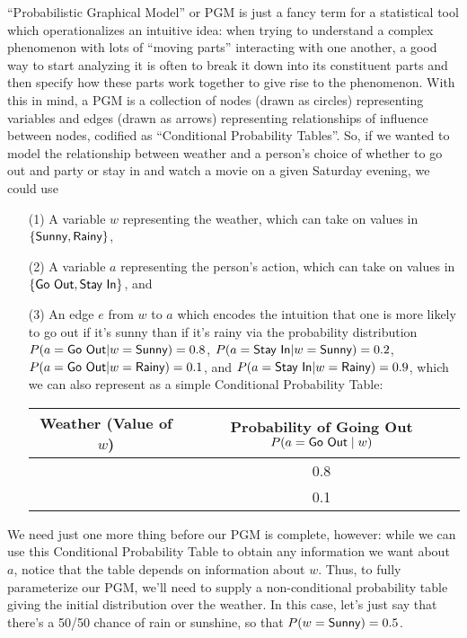 “Probabilistic Graphical Model” or PGM is just a fancy term for a statistical tool which operationalizes an intuitive idea: when trying to understand a complex phenomenon with lots of “moving parts” interacting with one another, a good way to start analyzing it is often to break it down into its constituent parts and then specify how these parts work together to give rise to the phenomenon. With this in mind, a PGM is a collection of nodes (drawn as circles) representing variables and edges (drawn as arrows) representing relationships of influence between nodes, codified as “Conditional Probability Tables”. So, if we wanted to model the relationship between weather and a person’s choice of whether to go out and party or stay in and watch a movie on a given Saturday evening, we could use
\begin{enumerate}
\item[(1)] A variable $w$ representing the weather, which can take on values in $\{\textsf{Sunny}{}, \textsf{Rainy}{}\}$,
\item[(2)] A variable $a$ representing the person’s action, which can take on values in $\{\textsf{Go Out}{}, \textsf{Stay In}{}\}$, and 
\item[(3)] An edge $e$ from $w$ to $a$ which encodes the intuition that one is more likely to go out if it’s sunny than if it’s rainy via the probability distribution $P(a = \textsf{Go Out}{} | w = \textsf{Sunny}{}) = 0.8$, $P(a = \textsf{Stay In}{} | w = \textsf{Sunny}{}) = 0.2$, $P(a = \textsf{Go Out}{} | w = \textsf{Rainy}{}) = 0.1$, and $P(a = \textsf{Stay In}{} | w = \textsf{Rainy}{}) = 0.9$, which we can also represent as a simple Conditional Probability Table:
\begin{center}
\begin{tabular}{cc} \hline
Weather (Value of $w$) & Probability of Going Out $P(a=\textsf{Go Out}{} \; | \; w)$\\ \hline \hline
\Sunny{} & 0.8 \\
\Rainy{} & 0.1 \\\hline
\end{tabular}
\end{center}
\end{enumerate}

We need just one more thing before our PGM is complete, however: while we can use this Conditional Probability Table to obtain any information we want about $a$, notice that the table depends on information about $w$. Thus, to fully parameterize our PGM, we’ll need to supply a non-conditional probability table giving the initial distribution over the weather. In this case, let’s just say that there’s a 50/50 chance of rain or sunshine, so that $P(w = \textsf{Sunny}{}) = 0.5$.

